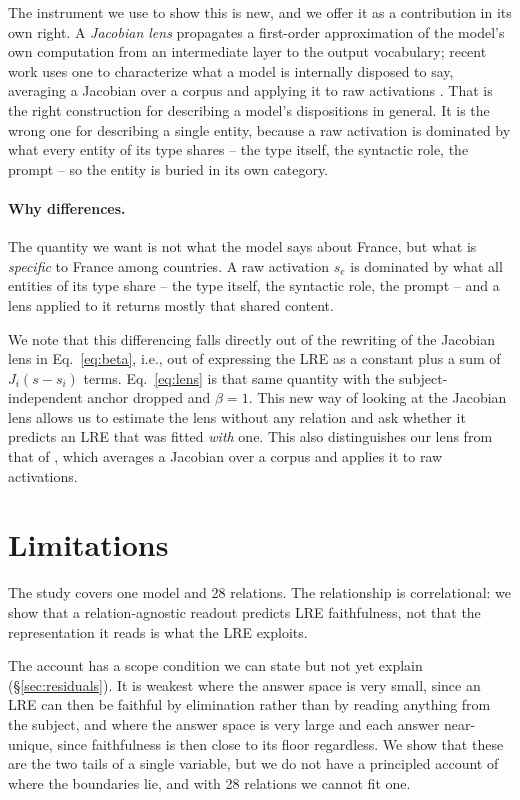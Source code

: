 \documentclass[11pt]{article}
\begin{document}
The instrument we use to show this is new, and we offer it as a
contribution in its own right. A \emph{Jacobian lens} propagates a
first-order approximation of the model's own computation from an
intermediate layer to the output vocabulary; recent work uses one to
characterize what a model is internally disposed to say, averaging a
Jacobian over a corpus and applying it to raw activations
\citep{gurnee2026workspace}. That is the right construction for
describing a model's dispositions in general. It is the wrong one for
describing a single entity, because a raw activation is dominated by what
every entity of its type shares -- the type itself, the syntactic role,
the prompt -- so the entity is buried in its own category.

\paragraph{Why differences.} The quantity we want is not what the model
says about France, but what is \emph{specific} to France among countries.
A raw activation $s_e$ is dominated by what all entities of its type share
-- the type itself, the syntactic role, the prompt -- and a lens applied
to it returns mostly that shared content. 

We note that this differencing
falls directly out of the rewriting of the Jacobian lens
in Eq.~\ref{eq:beta}, i.e., out of expressing the LRE as a
constant plus a sum of $J_i(s - s_i)$ terms. Eq.~\ref{eq:lens} is that
same quantity with the subject-independent anchor dropped and
$\beta = 1$.
This new way of looking at the Jacobian lens allows
us to estimate the lens without any relation and ask whether it
predicts an LRE that was fitted \emph{with} one. This also distinguishes
our lens from that of \citet{gurnee2026workspace}, which averages a
Jacobian over a corpus and applies it to raw activations.


\section{Limitations}
\label{sec:limitations}

The study covers one model and 28 relations. The relationship is
correlational: we show that a relation-agnostic readout predicts LRE
faithfulness, not that the representation it reads is what the LRE
exploits.


The account has a scope condition we can state but not yet explain
(\S\ref{sec:residuals}). It is weakest where the answer space is very
small, since an LRE can then be faithful by elimination rather than by
reading anything from the subject, and where the answer space is very
large and each answer near-unique, since faithfulness is then close to its
floor regardless. We show that these are the two tails of a single
variable, but we do not have a principled account of where the boundaries
lie, and with 28 relations we cannot fit one.
\end{document}
